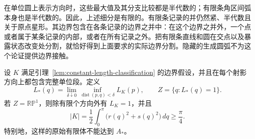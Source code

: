 在单位圆上表示方向时，这些最大值及其分支比较都是半代数的；有限条角区间弧本身也是半代数的。因此，上述细分是有限的。有限条记录的并仍然紧、半代数且关于原点星形。其边界包含在各条记录的边界之并中：在这个边界之并外，一个点或者属于某条记录的内部，或者在所有记录之外。把有限条直线和圆在交点以及暴露状态改变处分割，就恰好得到上面要求的实际边界分割。隐藏的生成圆弧不为这个论证提供边界接触。

\begin{corollary}[全圆紧约束情形]\label{cor:classification-full-circle}
设 $K$ 满足引理~\ref{lem:constant-length-classification} 的边界假设，并且在每个射影方向上都包含完整单位段。定义
\[
 L_*(q)=\lim_{\delta\downarrow0}\inf_{\operatorname{dist}(p,q)<\delta}L_K(p),
 \qquad Z=\{q:L_*(q)=1\}.
\]
若 $Z=\mathbb {RP}^1$，则除有限个方向外有 $L_K=1$，并且
\begin{equation}\label{eq:classification-area}
 |K|=\frac12\int_0^\pi\bigl(r(q)^2+s(q)^2\bigr)\,dq
       \ge\frac\pi4.
\end{equation}
特别地，这样的原始有限体不能达到 $A_*$。
\end{corollary}

